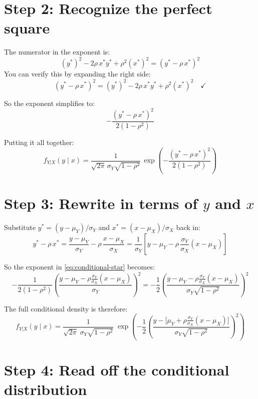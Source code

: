 \documentclass[11pt]{article}
\begin{document}
\section{Step 2: Recognize the perfect square}

The numerator in the exponent is:
\[
(y^*)^2 - 2\rho\, x^* y^* + \rho^2 (x^*)^2 = (y^* - \rho\, x^*)^2
\]
You can verify this by expanding the right side:
\[
(y^* - \rho\, x^*)^2 = (y^*)^2 - 2\rho\, x^* y^* + \rho^2(x^*)^2 \quad\checkmark
\]

So the exponent simplifies to:
\[
-\frac{(y^* - \rho\, x^*)^2}{2(1-\rho^2)}
\]

\medskip\noindent
Putting it all together:
\begin{equation}\label{eq:conditional-star}
f_{Y|X}(y\mid x)
= \frac{1}{\sqrt{2\pi}\,\sigma_Y\sqrt{1-\rho^2}}\,
\exp\!\left(
-\frac{(y^* - \rho\, x^*)^2}{2(1-\rho^2)}
\right)
\end{equation}

\section{Step 3: Rewrite in terms of $y$ and $x$}

Substitute $y^* = (y-\mu_Y)/\sigma_Y$ and $x^* = (x-\mu_X)/\sigma_X$ back in:
\[
y^* - \rho\, x^*
= \frac{y - \mu_Y}{\sigma_Y} - \rho\,\frac{x - \mu_X}{\sigma_X}
= \frac{1}{\sigma_Y}\left[y - \mu_Y - \rho\,\frac{\sigma_Y}{\sigma_X}(x-\mu_X)\right]
\]

\medskip\noindent
So the exponent in \eqref{eq:conditional-star} becomes:
\[
-\frac{1}{2(1-\rho^2)}\left(\frac{y - \mu_Y - \rho\frac{\sigma_Y}{\sigma_X}(x-\mu_X)}{\sigma_Y}\right)^{\!2}
= -\frac{1}{2}\left(\frac{y - \mu_Y - \rho\frac{\sigma_Y}{\sigma_X}(x-\mu_X)}{\sigma_Y\sqrt{1-\rho^2}}\right)^{\!2}
\]

\medskip\noindent
The full conditional density is therefore:
\begin{equation}\label{eq:conditional-full}
f_{Y|X}(y\mid x)
= \frac{1}{\sqrt{2\pi}\;\sigma_Y\sqrt{1-\rho^2}}\;
\exp\!\left(
-\frac{1}{2}\left(
\frac{y - \Big[\mu_Y + \rho\frac{\sigma_Y}{\sigma_X}(x - \mu_X)\Big]}{\sigma_Y\sqrt{1-\rho^2}}
\right)^{\!2}
\right)
\end{equation}

\section{Step 4: Read off the conditional distribution}
\end{document}
